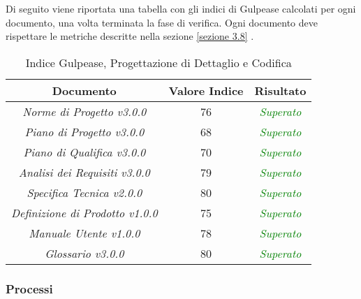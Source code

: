 Di seguito viene riportata una tabella con gli indici di Gulpease calcolati per ogni documento, una volta terminata la fase di verifica. Ogni documento deve rispettare le metriche descritte nella sezione \ref{sezione 3.8} .\\

\hspace{1cm}

\begin{table}[h]
	\begin{tabular}{|c|c|c|}
		\hline 
		\textbf{Documento} & \textbf{Valore Indice} & \textbf{Risultato} \\ 
		\hline
		\textit{Norme di Progetto v3.0.0} & 76 & \textcolor{green}{\textit{Superato}} \\  
		\textit{Piano di Progetto v3.0.0} & 68 & \textcolor{green}{\textit{Superato}} \\ 
		\textit{Piano di Qualifica v3.0.0} & 70 & \textcolor{green}{\textit{Superato}} \\ 
		\textit{Analisi dei Requisiti v3.0.0} & 79 & \textcolor{green}{\textit{Superato}} \\
		\textit{Specifica Tecnica v2.0.0} & 80 & \textcolor{green}{\textit{Superato}} \\ 
		\textit{Definizione di Prodotto v1.0.0} & 75 & \textcolor{green}{\textit{Superato}} \\ 
		\textit{Manuale Utente v1.0.0} & 78 & \textcolor{green}{\textit{Superato}} \\ 
		\textit{Glossario v3.0.0} & 80 & \textcolor{green}{\textit{Superato}} \\ 
		\hline 
\end{tabular}
\caption{Indice Gulpease, Progettazione di Dettaglio e Codifica}
\end{table}


\subsubsection{Processi}
\label{appendice 6}
\vspace{3mm}

